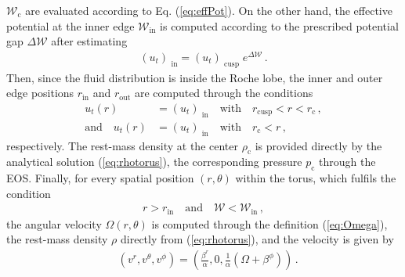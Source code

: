 $\mathcal{W}_{\text{c}}$ are evaluated according to Eq.
(\ref{eq:effPot}). On the other hand, the effective potential at the
inner edge $\mathcal{W}_{\text{in}}$ is computed according to the
prescribed potential gap $\Delta \mathcal{W}$ after estimating
%
\begin{align}
(u_{t})_{\text{ in}} = (u_{t})_{\text{ cusp}} \;e^{\Delta \mathcal{W}}\,.
\end{align}
%
Then, since the fluid distribution is inside the Roche lobe, the inner
and outer edge positions $r_{\text{in}}$ and $r_{\text{out}}$ are
computed through the conditions
%
\begin{align}
u_t(r) &= (u_{t})_{\text{ in}} \quad \text{with} \quad r_{\text{cusp}} <
r < r_{\text{c}}\,,
\\
\text{and}\quad
u_t(r) &= (u_{t})_{\text{ in}} \quad \text{with} \quad r_{\text{c}} <
r\,,
\end{align}
respectively. The rest-mass density at the center $\rho_{\text{c}}$ is
provided directly by the analytical solution (\ref{eq:rhotorus}), the
corresponding pressure $p_{\text{c}}$ through the EOS.
Finally, for every spatial position
$(r,\theta)$ within the torus, \ie which fulfils the condition
%
\begin{align}
r>r_{\text{in}} \quad \text{and} \quad
\mathcal{W}<\mathcal{W}_{\text{in}}\,,
\end{align}
%
the angular velocity $\Omega(r,\theta)$ is computed through the
definition (\ref{eq:Omega}), the rest-mass density $\rho$ directly from
(\ref{eq:rhotorus}), and the velocity is given by
\begin{align}
&(v^r ,v^\theta ,v^{\phi} ) = \left( \frac{\beta^r}{\alpha} , 0 ,
\frac{1}{\alpha}(\Omega + \beta^\phi) \right)\,.
\end{align}




